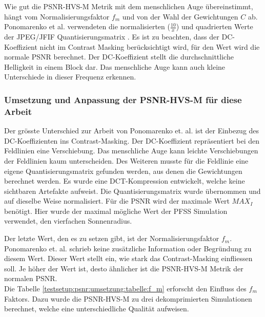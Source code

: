 Wie gut die PSNR-HVS-M Metrik mit dem menschlichen Auge übereinstimmt, hängt vom Normalisierungsfaktor $f_m$ und von der Wahl der Gewichtungen $C$ ab. Ponomarenko et al. verwendeten die normalisierten ($\frac{10}{x}$) und quadrierten Werte der JPEG/JFIF Quantisierungsmatrix \cite{wallace1992jpeg}. Es ist zu beachten, dass der DC-Koeffizient \cite{wiki:dccoeff} nicht im Contrast Masking berücksichtigt wird, für den Wert wird die normale PSNR berechnet. Der DC-Koeffizient stellt die durchschnittliche Helligkeit in einem Block dar. Das menschliche Auge kann auch kleine Unterschiede in dieser Frequenz erkennen.

\subsubsection{Umsetzung und Anpassung der PSNR-HVS-M für diese Arbeit}
Der grösste Unterschied zur Arbeit von Ponomarenko et. al. ist der Einbezug des DC-Koeffizienten ins Contrast-Masking. Der DC-Koeffizient repräsentiert bei den Feldlinien eine Verschiebung. Das menschliche Auge kann leichte Verschiebungen der Feldlinien kaum unterscheiden. Des Weiteren musste für die Feldlinie eine eigene Quantisierungsmatrix gefunden werden, aus denen die Gewichtungen berechnet werden. Es wurde eine DCT-Kompression entwickelt, welche keine sichtbaren Artefakte aufweist. Die Quantisierungsmatrix wurde übernommen und auf dieselbe Weise normalisiert. Für die PSNR wird der maximale Wert $MAX_I$ benötigt. Hier wurde der maximal mögliche Wert der PFSS Simulation verwendet, den vierfachen Sonnenradius.

Der letzte Wert, den es zu setzen gibt, ist der Normalisierungsfaktor $f_m$. Ponomarenko et. al. schrieb keine zusätzliche Information oder Begründung zu diesem Wert. Dieser Wert stellt ein, wie stark das Contrast-Masking einfliessen soll. Je höher der Wert ist, desto ähnlicher ist die PSNR-HVS-M Metrik der normalen PSNR.\\
Die Tabelle \ref{testsetup:psnr:umsetzung:tabelle:f_m} erforscht den Einfluss des $f_m$ Faktors. Dazu wurde die PSNR-HVS-M zu drei dekomprimierten Simulationen berechnet, welche eine unterschiedliche Qualität aufweisen.


